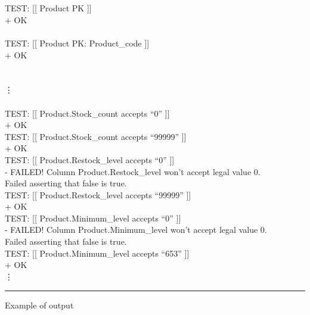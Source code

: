 \documentclass[sigconf, authordraft]{acmart}
\begin{document}
\begin{table}
\begin{tabbing}
         \\[\codeskip]
         \\[\codeskip]
        TEST: [[ Product PK ]]  \\
        \>  \textcolor{test green}{+ OK} \\
         \\[\codeskip]
        TEST: [[ Product PK: Product\_code ]]  \\
        \>  \textcolor{test green}{+ OK} \\
         \\[\codeskip]
         \\[\dotvskip]
        \hspace*{\dothskip}\vdots \\
         \\[\codeskip]
        TEST: [[ Product.Stock\_count accepts ``0'' ]]  \\
        \>  \textcolor{test green}{+ OK} \\
        TEST: [[ Product.Stock\_count accepts ``99999'' ]]  \\
        \>  \textcolor{test green}{+ OK} \\
        TEST: [[ Product.Restock\_level accepts ``0'' ]]  \\
        \>  \textcolor{test red}{- FAILED! Column Product.Restock\_level won't accept legal value 0.} \\
        \textcolor{test red}{Failed asserting that false is true.} \\
        TEST: [[ Product.Restock\_level accepts ``99999'' ]]  \\
        \>  \textcolor{test green}{+ OK} \\
        TEST: [[ Product.Minimum\_level accepts ``0'' ]]  \\
        \>  \textcolor{test red}{- FAILED! Column Product.Minimum\_level won't accept legal value 0.} \\
        \textcolor{test red}{Failed asserting that false is true.} \\
        TEST: [[ Product.Minimum\_level accepts ``653'' ]]  \\
        \>  \textcolor{test green}{+ OK} \\[\dotvskip]
        \hspace*{\dothskip}\vdots \\
    \end{tabbing}
    \hrule
    \caption{Example of output}
\end{table}
\end{document}
